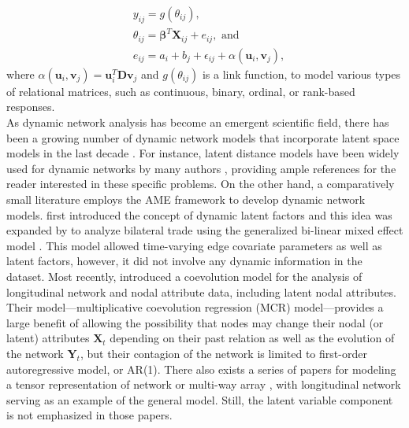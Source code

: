 \documentclass[a4paper]{article}
\begin{document}
	\begin{equation}\label{AME}
		\begin{aligned}
			&y_{ij} = g(\theta_{ij}),\\
			& \theta_{ij} = \boldsymbol{\beta}^T\boldsymbol{X}_{ij} + e_{ij}, \mbox{ and }\\
			& e_{ij} = a_i + b_j + \epsilon_{ij} + \alpha(\boldsymbol{u}_i, \boldsymbol{v}_j), 
		\end{aligned}
	\end{equation}
where $\alpha(\boldsymbol{u}_i, \boldsymbol{v}_j) = \boldsymbol{u}_i^T\boldsymbol{D}\boldsymbol{v}_j$ and $ g(\theta_{ij})$ is a link function, to model various types of relational matrices, such as continuous, binary, ordinal, or rank-based responses.\\ \newline
As dynamic network analysis has become an emergent scientific field, there has been a growing number of dynamic network models that incorporate latent space models in the last decade \citep{kim2017review}. For instance, latent distance models have been widely used for dynamic networks by many authors \citep{sarkar2005dynamic,sarkar2007latent,sewell2015latent,sewell2016latent,friel2016interlocking}, providing ample references for the reader interested in these specific problems. On the other hand, a comparatively small literature employs the AME framework to develop dynamic network models. \cite{ward2007persistent} first introduced the concept of dynamic latent factors and this idea was expanded by \cite{ward2013gravity} to analyze bilateral trade using the generalized bi-linear mixed effect model \citep{hoff2005bilinear}. This model allowed time-varying edge covariate parameters as well as latent factors, however, it did not involve any dynamic information in the dataset. Most recently, \cite{he2017multiplicative} introduced a coevolution model for the analysis of longitudinal network and nodal attribute data, including latent nodal attributes. Their model---multiplicative coevolution regression (MCR) model---provides a large benefit of allowing the possibility that nodes may change their nodal (or latent) attributes  $\boldsymbol{X}_t$ depending on their past relation as well as the evolution of the network $\boldsymbol{Y}_t$, but their contagion of the network is limited to first-order autoregressive model, or AR(1). There also exists a series of papers for modeling a tensor representation of network or multi-way array \citep{hoff2011hierarchical,hoff2011separable,hoff2015multilinear,minhas2016new}, with longitudinal network serving as an example of the general model. Still, the latent variable component is not emphasized in those papers.
\end{document}

